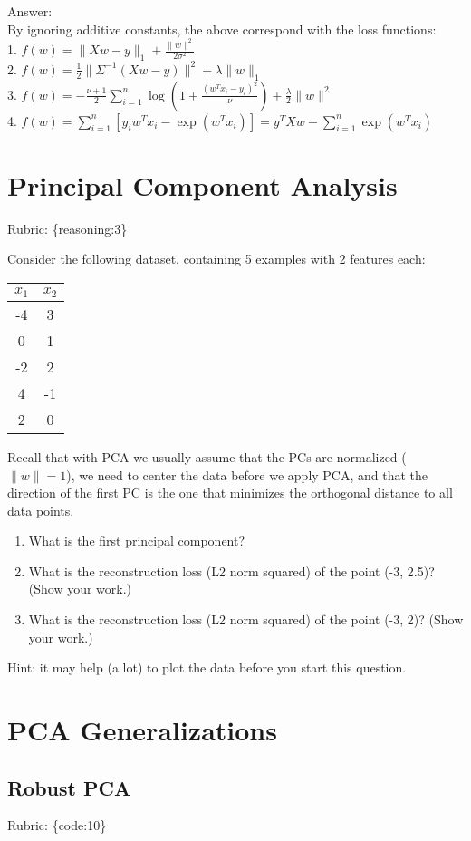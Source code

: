 \documentclass{article}
\def\rubric#1{\gre{Rubric: \{#1\}}}{}
\def\blu#1{{\color{blu}#1}}
\def\gre#1{{\color{gre}#1}}
\def\norm#1{\|#1\|}
\def\ans#1{\gre{Answer: #1}}{}
\def\enum#1{\begin{enumerate}#1\end{enumerate}}
\begin{document}
\ans{ \\By ignoring additive constants, the above correspond with the loss functions: \\1. $f(w) = \norm{Xw - y}_1 + \frac{\norm{w}^2}{2 \sigma^2}$
\\ 2. $f(w) = \frac{1}{2} \norm{\Sigma^{-1}(Xw - y)}^2 + \lambda \norm{w}_1$
\\ 3. $f(w) = -\frac{\nu + 1}{2} \sum_{i = 1}^{n}\log \left(1 + \frac{(w^{T} x_i - y_i)^2}{\nu} \right) + \frac{\lambda}{2} \norm{w}^2$
\\ 4. $f(w) = \sum_{i = 1}^n [y_i w^T x_i - \exp(w^T x_i)] = y^TXw - \sum_{i = 1}^n \exp(w^T x_i)$}


\section{Principal Component Analysis}
\rubric{reasoning:3}


Consider the following dataset, containing 5 examples with 2 features each:
\begin{center}
\begin{tabular}{cc}
$x_1$ & $x_2$\\
\hline
-4 & 3\\
0 & 1\\
-2 & 2\\
4 & -1\\
2 & 0\\
\end{tabular}
\end{center}
Recall that with PCA we usually assume that the PCs are normalized ($\norm{w} = 1$), we need to center the data before we apply PCA, and that the direction of the first PC is the one that minimizes the orthogonal distance to all data points.
\blu{
\enum{
\item What is the first principal component?
\item What is the reconstruction loss (L2 norm squared) of the point (-3, 2.5)? (Show your work.)
\item What is the reconstruction loss (L2 norm squared) of the point (-3, 2)? (Show your work.)
}
}
Hint: it may help (a lot) to plot the data before you start this question.



\section{PCA Generalizations}

\subsection{Robust PCA}
\rubric{code:10}
\end{document}
